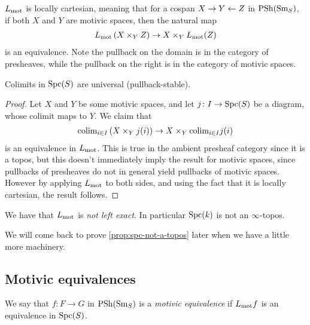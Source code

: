 \documentclass[11pt,openany]{book}
\begin{document}
\begin{proposition} \cite[3.15]{Hoyois6}
$L_{\mathrm{mot}}$ is locally cartesian, meaning that for a cospan $X \to Y \leftarrow Z$ in $\mathrm{PSh}(\mathrm{Sm}_S)$, if both $X$ and $Y$ are motivic spaces, then the natural map
\begin{align*}
    L_{\mathrm{mot}} \left( X \times_Y Z \right) \to X \times_Y L_{\mathrm{mot}}(Z)
\end{align*}
is an equivalence. Note the pullback on the domain is in the category of presheaves, while the pullback on the right is in the category of motivic spaces.
\end{proposition}

\begin{corollary}\label{cor:universal-colimits-motivic-spaces}
Colimits in $\mathrm{Spc}(S)$ are universal (pullback-stable). 
\end{corollary}
\begin{proof} Let $X$ and $Y$ be some motivic spaces, and let $j \colon I \to \mathrm{Spc}(S)$ be a diagram, whose colimit maps to $Y$. We claim that
\begin{align*}
    \mathrm{colim}_{i\in I} \left( X \times_Y j(i) \right) \to X \times_Y \mathrm{colim}_{i\in I} j(i)
\end{align*}
is an equivalence in $L_{\mathrm{mot}}$. This is true in the ambient presheaf category since it is a topos, but this doesn't immediately imply the result for motivic spaces, since pullbacks of presheaves do not in general yield pullbacks of motivic spaces. However by applying $L_{\mathrm{mot}}$ to both sides, and using the fact that it is locally cartesian, the result follows.
\end{proof}


\begin{proposition}\label{prop:spc-not-a-topos} 
We have that $L_{\mathrm{mot}}$ is \textit{not left exact}. In particular $\mathrm{Spc}(k)$ is not an $\infty$-topos.
\end{proposition}
We will come back to prove \autoref{prop:spc-not-a-topos} later when we have a little more machinery.

\subsection{Motivic equivalences}


\begin{definition} We say that $f \colon F \to G$ in $\mathrm{PSh}(\mathrm{Sm}_S)$ is a \textit{motivic equivalence} if $L_{\mathrm{mot}} f$ is an equivalence in $\mathrm{Spc}(S)$.
\end{definition}
\end{document}
